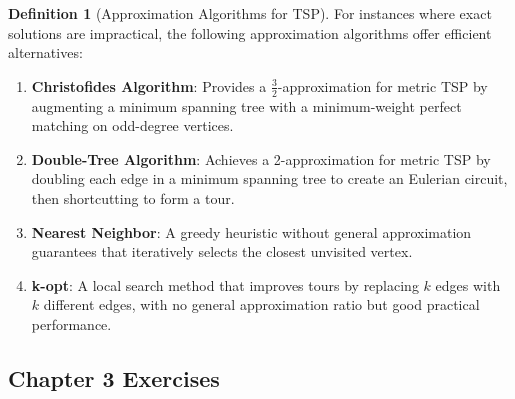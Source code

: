 \documentclass{article}
\theoremstyle{definition}
\newtheorem{definition}{Definition}
\begin{document}
\begin{definition}[Approximation Algorithms for TSP]
For instances where exact solutions are impractical, the following approximation algorithms offer efficient alternatives:

\begin{enumerate}
    \item \textbf{Christofides Algorithm}: Provides a $\frac{3}{2}$-approximation for metric TSP by augmenting a minimum spanning tree with a minimum-weight perfect matching on odd-degree vertices.
    
    \item \textbf{Double-Tree Algorithm}: Achieves a 2-approximation for metric TSP by doubling each edge in a minimum spanning tree to create an Eulerian circuit, then shortcutting to form a tour.
    
    \item \textbf{Nearest Neighbor}: A greedy heuristic without general approximation guarantees that iteratively selects the closest unvisited vertex.
    
    \item \textbf{k-opt}: A local search method that improves tours by replacing $k$ edges with $k$ different edges, with no general approximation ratio but good practical performance.
\end{enumerate}
\end{definition}


\pagebreak
\newpage

\subsection{Chapter 3 Exercises}
\end{document}
